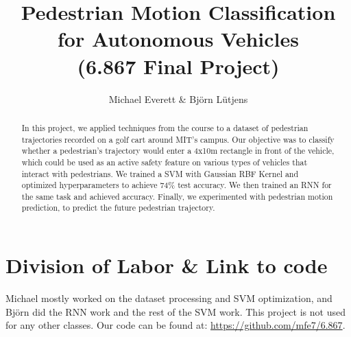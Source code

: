 \documentclass[letterpaper, 10 pt, conference]{ieeeconf}
\title{\LARGE \bf Pedestrian Motion Classification for Autonomous Vehicles\\(6.867 Final Project)}
\author{Michael Everett \& Bj{\"o}rn L{\"u}tjens}
\newcommand{\meXX}[1]{\added[id=me,remark={}]{#1}}
\begin{document}
\maketitle
\thispagestyle{empty} \pagestyle{empty}


\begin{abstract}
In this project, we applied techniques from the course to a dataset of pedestrian trajectories recorded on a golf cart around MIT's campus.
Our objective was to classify whether a pedestrian's trajectory would enter a 4x10m rectangle in front of the vehicle, which could be used as an active safety feature on various types of vehicles that interact with pedestrians.
We trained a SVM with Gaussian RBF Kernel and optimized hyperparameters to achieve 74\% test accuracy.
We then trained an RNN for the same task and achieved \meXX{RNN accuracy?} accuracy.
Finally, we experimented with pedestrian motion prediction, to predict the future pedestrian trajectory.
\end{abstract}




% 









\section*{Division of Labor \& Link to code}
Michael mostly worked on the dataset processing and SVM optimization, and Bj{\"o}rn did the RNN work and the rest of the SVM work.
This project is not used for any other classes.
Our code can be found at: \url{https://github.com/mfe7/6.867}.
\balance
 
%  

\end{document}
